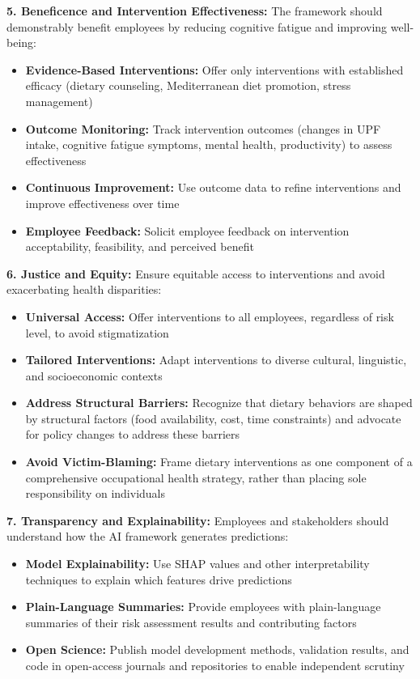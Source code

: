 \documentclass[journal,twoside,10pt]{IEEEtran}
\begin{document}
\textbf{5. Beneficence and Intervention Effectiveness:}
The framework should demonstrably benefit employees by reducing cognitive fatigue and improving well-being:
\begin{itemize}
\item \textbf{Evidence-Based Interventions:} Offer only interventions with established efficacy (dietary counseling, Mediterranean diet promotion, stress management)
\item \textbf{Outcome Monitoring:} Track intervention outcomes (changes in UPF intake, cognitive fatigue symptoms, mental health, productivity) to assess effectiveness
\item \textbf{Continuous Improvement:} Use outcome data to refine interventions and improve effectiveness over time
\item \textbf{Employee Feedback:} Solicit employee feedback on intervention acceptability, feasibility, and perceived benefit
\end{itemize}

\textbf{6. Justice and Equity:}
Ensure equitable access to interventions and avoid exacerbating health disparities:
\begin{itemize}
\item \textbf{Universal Access:} Offer interventions to all employees, regardless of risk level, to avoid stigmatization
\item \textbf{Tailored Interventions:} Adapt interventions to diverse cultural, linguistic, and socioeconomic contexts
\item \textbf{Address Structural Barriers:} Recognize that dietary behaviors are shaped by structural factors (food availability, cost, time constraints) and advocate for policy changes to address these barriers
\item \textbf{Avoid Victim-Blaming:} Frame dietary interventions as one component of a comprehensive occupational health strategy, rather than placing sole responsibility on individuals
\end{itemize}

\textbf{7. Transparency and Explainability:}
Employees and stakeholders should understand how the AI framework generates predictions:
\begin{itemize}
\item \textbf{Model Explainability:} Use SHAP values and other interpretability techniques to explain which features drive predictions
\item \textbf{Plain-Language Summaries:} Provide employees with plain-language summaries of their risk assessment results and contributing factors
\item \textbf{Open Science:} Publish model development methods, validation results, and code in open-access journals and repositories to enable independent scrutiny
\end{itemize}
\end{document}
